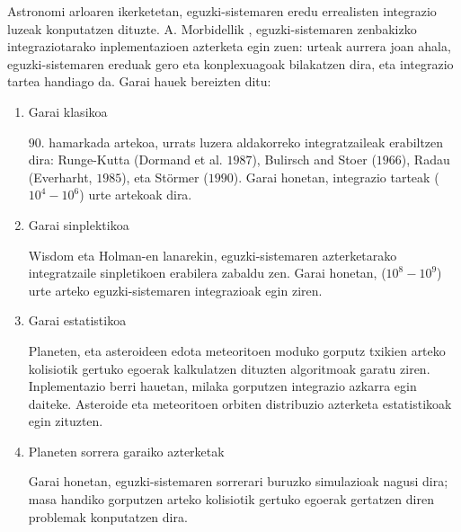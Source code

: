 Astronomi arloaren ikerketetan, eguzki-sistemaren eredu errealisten integrazio luzeak konputatzen dituzte. A. Morbidellik \cite{Morbidelli2002}, eguzki-sistemaren zenbakizko integraziotarako inplementazioen azterketa egin zuen: urteak aurrera joan ahala, eguzki-sistemaren ereduak gero eta konplexuagoak bilakatzen dira, eta integrazio tartea handiago da. Garai hauek bereizten ditu:
\begin{enumerate}

\item Garai klasikoa

$90$. hamarkada artekoa, urrats luzera aldakorreko integratzaileak erabiltzen dira: Runge-Kutta (Dormand et al. $1987$), Bulirsch and Stoer ($1966$), Radau (Everharht, $1985$), eta Störmer ($1990$). Garai honetan, integrazio tarteak ($10^4-10^6$) urte artekoak dira.  

\item Garai sinplektikoa

Wisdom eta Holman-en \cite[1991]{Sussman1992} lanarekin, eguzki-sistemaren azterketarako integratzaile sinpletikoen erabilera zabaldu zen. Garai honetan, ($10^8-10^9$) urte arteko eguzki-sistemaren integrazioak egin ziren.  

\item Garai estatistikoa

Planeten, eta asteroideen edota meteoritoen moduko gorputz txikien  arteko kolisiotik gertuko egoerak kalkulatzen dituzten algoritmoak garatu ziren. Inplementazio berri hauetan, milaka gorputzen integrazio azkarra egin daiteke. Asteroide eta meteoritoen orbiten distribuzio azterketa estatistikoak egin zituzten.

\item Planeten sorrera garaiko azterketak

Garai honetan, eguzki-sistemaren sorrerari buruzko simulazioak nagusi dira; masa handiko gorputzen arteko kolisiotik gertuko egoerak gertatzen diren problemak konputatzen dira. 
 
\end{enumerate}

